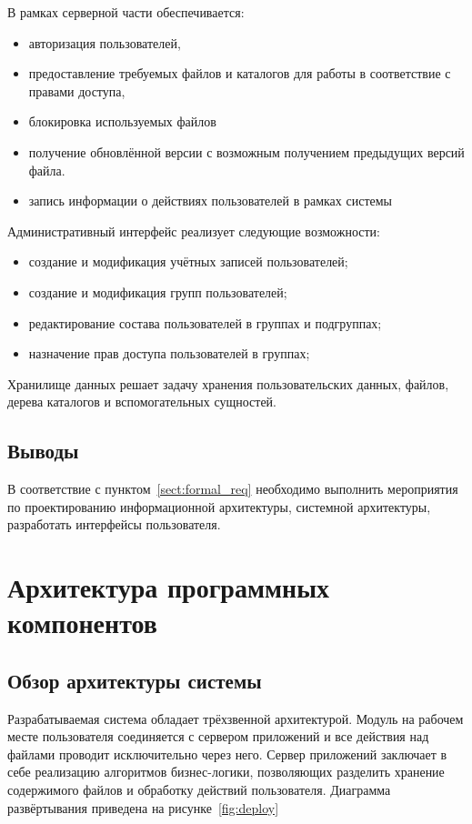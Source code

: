 \documentclass[utf8,usehyperref,12pt]{G7-32}
\begin{document}
В рамках серверной части обеспечивается:
\begin{itemize}
\item авторизация пользователей, 
\item предоставление требуемых файлов и каталогов для работы в соответствие с правами доступа, 
\item блокировка используемых файлов 
\item получение обновлённой версии с возможным получением предыдущих версий файла.
\item запись информации о действиях пользователей в рамках системы
 \end{itemize}
 
Административный интерфейс реализует следующие возможности:

\begin{itemize}
	\item создание и модификация учётных записей пользователей;
	\item создание и модификация групп пользователей;
	\item редактирование состава пользователей в группах и подгруппах;
	\item назначение прав доступа пользователей в группах;
\end{itemize}

Хранилище данных решает задачу хранения пользовательских данных, файлов, дерева каталогов и вспомогательных сущностей.

\subsection{Выводы}
В соответствие с пунктом~\ref{sect:formal_req} необходимо выполнить мероприятия по проектированию информационной архитектуры, системной архитектуры, разработать интерфейсы пользователя.

\section{Архитектура программных компонентов}
\subsection{Обзор архитектуры системы}

Разрабатываемая система обладает трёхзвенной архитектурой. Модуль на рабочем месте пользователя соединяется с сервером приложений и все действия над файлами проводит исключительно через него. Сервер приложений заключает в себе реализацию алгоритмов бизнес-логики, позволяющих разделить хранение содержимого файлов и обработку действий пользователя. Диаграмма развёртывания приведена на рисунке~\ref{fig:deploy}
\end{document}
